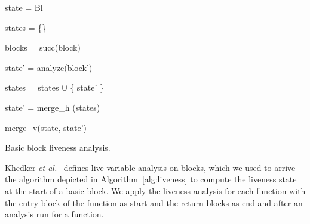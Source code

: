 \begin{algorithm}[h!]
 	\SetAlgoLined
        \BlankLine
	{
 	state = Bl                                                  
 	

	states = \{\}                                               
	
	blocks = succ(block)                                        
	
	 {
	
 		state' = analyze(block')                            
 		
		states = states $\cup$ \{ state' \}                 
	}

	state' = merge\_h (states)                                  

	\Return merge\_v(state, state')                             

	}
\caption{Basic block liveness analysis.}
\label{alg:liveness}
\end{algorithm}

Khedker \textit{et al.}~ \cite{khedker2009data} defines live variable analysis on blocks, which we used to arrive the
algorithm depicted in Algorithm~\ref{alg:liveness} to compute the liveness state at the start of a basic block. 
We apply the liveness analysis for each function with the entry block of the function as start and the return blocks as end and after an analysis run for a function.

